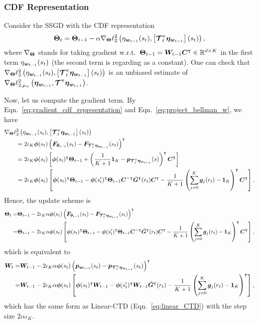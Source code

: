 \subsubsection{CDF Representation}
Consider the SSGD with the CDF representation
\[
    {\bm{\Theta}}_t={\bm{\Theta}}_{t-1}-\alpha\nabla_{{\bm{\Theta}}}\ell_2^2\left({{\eta}_{{\bm{w}}_{t-1}}(s_t), \left[{\bm{\mathcal{T}}_t^\pi{\bm{\eta}_{{\bm{w}}_{t-1}}}}\right](s_{t})}\right),
\]
where $\nabla_{{\bm{\Theta}}}$ stands for taking gradient w.r.t.\ ${\bm{\Theta}}_{t-1}={\bm{W}}_{t-1}{\bm{C}}^{\intercal} \in {\mathbb R}^{d\times K}$ in the first term ${\eta}_{{\bm{w}}_{t-1}}(s_t)$ (the second term is regarding as a constant). 
One can check that $\nabla_{{\bm{\Theta}}}\ell_2^2\left({{\eta}_{{\bm{w}}_{t-1}}(s_t), \left[{\bm{\mathcal{T}}_t^\pi{\bm{\eta}_{{\bm{w}}_{t-1}}}}\right](s_{t})}\right)$ is an unbiased estimate of $\nabla_{{\bm{\Theta}}} \ell_{2,\mu_{\pi}}^2\left({\bm{\eta}_{{\bm{w}}_{t-1}},\bm{\mathcal{T}}^\pi{\bm{\eta}_{{\bm{w}}_{t-1}}}}\right)$.

Now, let us compute the gradient term.
By Eqn.~\eqref{eq:gradient_cdf_representation} and Eqn.~\eqref{eq:project_bellman_w}, we have
    \begin{align*}
        &\nabla_{{\bm{\Theta}}} \ell_2^2\left({{\eta}_{{\bm{w}}_{t-1}}(s_t),\left[{\bm{\mathcal{T}}_t^\pi{\bm{\eta}_{{\bm{w}}_{t-1}}}}\right](s_{t})}\right)\\
        &\qquad=2\iota_K{\bm{\phi}}(s_t)\left({{\bm{F}}_{{\bm{\theta}}_{t-1}}(s_t)-{\bm{F}}_{\bm{\mathcal{T}}_t^\pi{\bm{\eta}_{{\bm{w}}_{t-1}}}}(s_t)}\right)^{\intercal}\\
        &\qquad=2\iota_K{\bm{\phi}}(s_t)\left[{{\bm{\phi}}(s_t)^{\intercal}{\bm{\Theta}}_{t-1}+\left({\frac{1}{K+1}\bm{1}_{K}-{\bm{p}}_{\bm{\mathcal{T}}_t^\pi{\bm{\eta}_{{\bm{w}}_{t-1}}}}(s)}\right)^{\intercal}{\bm{C}}^{\intercal}}\right]\\
        &\qquad=2\iota_K{\bm{\phi}}(s_t)\left[{{\bm{\phi}}(s_t)^{\intercal}{\bm{\Theta}}_{t-1}-{\bm{\phi}}(s_t^\prime)^{\intercal}{\bm{\Theta}}_{t-1}{\bm{C}}^{-\intercal}\tilde{{\bm{G}}}^{\intercal}(r_t){\bm{C}}^{\intercal}-\frac{1}{K+1}\left({\sum_{j=0}^K{\bm{g}}_j(r_t)-\bm{1}_{K}}\right)^{\intercal}{\bm{C}}^{\intercal}}\right].
    \end{align*}
Hence, the update scheme is
\begin{equation}\label{eq:CDF_SSGD_update}
   \begin{aligned}
{\bm{\Theta}}_t=&{\bm{\Theta}}_{t-1}-2\iota_K\alpha{\bm{\phi}}(s_t)\left({{\bm{F}}_{{\bm{\theta}}_{t-1}}(s_t)-{\bm{F}}_{\bm{\mathcal{T}}_t^\pi{\bm{\eta}_{{\bm{w}}_{t-1}}}}(s_t)}\right)^{\intercal}\\
=&{\bm{\Theta}}_{t-1}-2\iota_K\alpha{\bm{\phi}}(s_t)\left[{{\bm{\phi}}(s_t)^{\intercal}{\bm{\Theta}}_{t-1}-{\bm{\phi}}(s_t^\prime)^{\intercal}{\bm{\Theta}}_{t-1}{\bm{C}}^{-\intercal}\tilde{{\bm{G}}}^{\intercal}(r_t){\bm{C}}^{\intercal}-\frac{1}{K+1}\left({\sum_{j=0}^K{\bm{g}}_j(r_t)-\bm{1}_{K}}\right)^{\intercal}{\bm{C}}^{\intercal}}\right],
\end{aligned} 
\end{equation}
which is equivalent to
\begin{align*}
{\bm{W}}_t=&{\bm{W}}_{t-1}-2\iota_K\alpha{\bm{\phi}}(s_t)\left({{\bm{p}}_{{\bm{w}}_{t-1}}(s_t)-{\bm{p}}_{\bm{\mathcal{T}}_t^\pi{\bm{\eta}_{{\bm{w}}_{t-1}}}}(s_t)}\right)^{\intercal}\\
=&{\bm{W}}_{t-1}-2\iota_K\alpha{\bm{\phi}}(s_t)\left[{{\bm{\phi}}(s_t)^{\intercal}{\bm{W}}_{t-1}-{\bm{\phi}}(s_t^\prime)^{\intercal}{\bm{W}}_{t-1}\tilde{{\bm{G}}}^{\intercal}(r_t)-\frac{1}{K+1}\left({\sum_{j=0}^K{\bm{g}}_j(r_t)-\bm{1}_{K}}\right)^{\intercal}}\right],
\end{align*}
which has the same form as Linear-CTD (Eqn.~\eqref{eq:linear_CTD}) with the step size $2\alpha\iota_K$.




